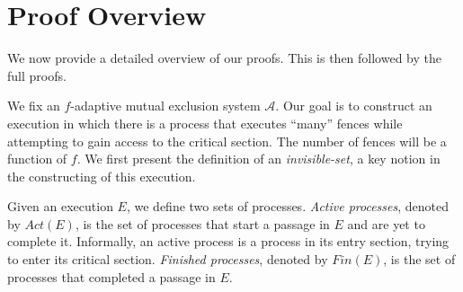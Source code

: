 \section{Proof Overview}
\label{sec:proofOverview}

We now provide a detailed overview of our proofs. This is then followed by the full proofs.

We fix an $f$-adaptive mutual exclusion system $\mathcal{A}$. Our goal is to construct an execution in which there is a process that executes ``many'' fences while attempting to gain access to the critical section. The number of fences will be a function of $f$. We first present the definition of an \emph{invisible-set}, a key notion in the constructing of this execution.

Given an execution $E$, we define two sets of processes. \emph{Active processes}, denoted by $Act(E)$, is the set of processes that start a passage in $E$ and are yet to complete it. Informally, an active process is a process in its entry section, trying to enter its critical section. \emph{Finished processes}, denoted by $Fin(E)$, is the set of processes that completed a passage in $E$.

